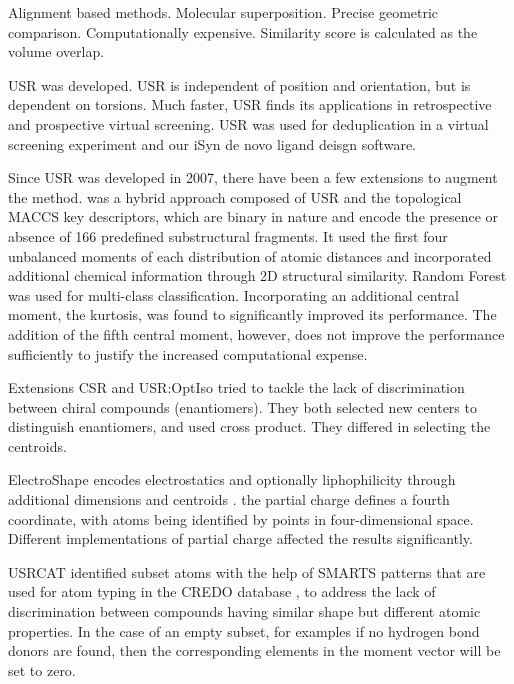 \documentclass[twocolumn]{svjour3}          %
\begin{document}
Alignment based methods. Molecular superposition. Precise geometric comparison. Computationally expensive. Similarity score is calculated as the volume overlap.

USR \cite{1379,1280} was developed. USR is independent of position and orientation, but is dependent on torsions. Much faster, USR finds its applications in retrospective \cite{1332} and prospective \cite{1380} virtual screening. USR was used for deduplication in a virtual screening experiment \cite{1390} and our iSyn \cite{1381,1387} de novo ligand deisgn software. %

Since USR was developed in 2007, there have been a few extensions \cite{1333,1334,1335,1337,1338,1331} to augment the method. \cite{1333} was a hybrid approach composed of USR and the topological MACCS key descriptors, which are binary in nature and encode the presence or absence of 166 predefined substructural fragments. It used the first four unbalanced moments of each distribution of atomic distances and incorporated additional chemical information through 2D structural similarity. Random Forest \cite{1309} was used for multi-class classification. Incorporating an additional central moment, the kurtosis, was found to significantly improved its performance. The addition of the fifth central moment, however, does not improve the performance sufficiently to justify the increased computational expense.

Extensions CSR \cite{1334} and USR:OptIso \cite{1335} tried to tackle the lack of discrimination between chiral compounds (enantiomers). They both selected new centers to distinguish enantiomers, and used cross product. They differed in selecting the centroids.

ElectroShape encodes electrostatics and optionally liphophilicity through additional dimensions and centroids \cite{1337,1338}. \cite{1337} the partial charge defines a fourth coordinate, with atoms being identified by points in four-dimensional space. Different implementations of partial charge affected the results significantly.

USRCAT \cite{1331} identified subset atoms with the help of SMARTS patterns that are used for atom typing in the CREDO database \cite{522}, to address the lack of discrimination between compounds having similar shape but different atomic properties. In the case of an empty subset, for examples if no hydrogen bond donors are found, then the corresponding elements in the moment vector will be set to zero.
\end{document}
